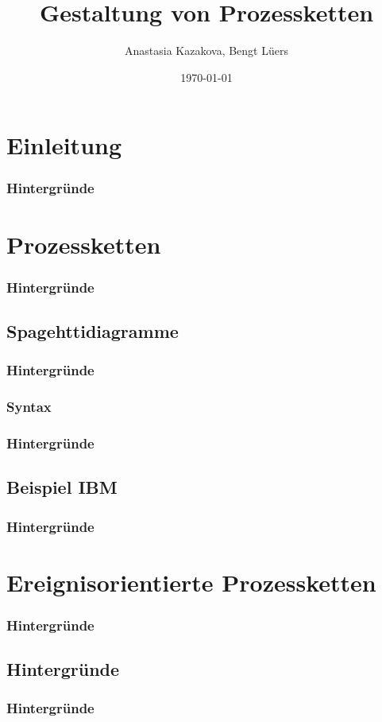 \documentclass{beamer}
\title{Gestaltung von Prozessketten}
\author[A. Kazakova, B. Lüers]{Anastasia Kazakova, Bengt Lüers}
\institute[Universität Oldenburg]{
  \inst{}Fakultät 2 - Informatik, Wirtschafts- und Rechtswissenschaften}
\date{\today}
\begin{document}
 \frame{\titlepage}


 \section[Einleitung]{Einleitung}
 \begin{frame}
  \frametitle{Hintergründe}
\end{frame}

 \section[Prozessketten]{Prozessketten}
 \begin{frame}
  \frametitle{Hintergründe}
 \end{frame}

 \subsection[Spaghettidiagramme]{Spagehttidiagramme}
 \begin{frame}
  \frametitle{Hintergründe}

 \end{frame}

 \subsubsection[Syntax]{Syntax}
 \begin{frame}
  \frametitle{Hintergründe}

 \end{frame}

 \subsection[Beispiel IBM]{Beispiel IBM}
 \begin{frame}
  \frametitle{Hintergründe}

 \end{frame}

 \section[Ereignisorientierte Prozessketten]{Ereignisorientierte Prozessketten}
 \begin{frame}
  \frametitle{Hintergründe}

 \end{frame}

 \subsection[Hintergründe]{Hintergründe}
 \begin{frame}
  \frametitle{Hintergründe}

 \end{frame}
\end{document}
